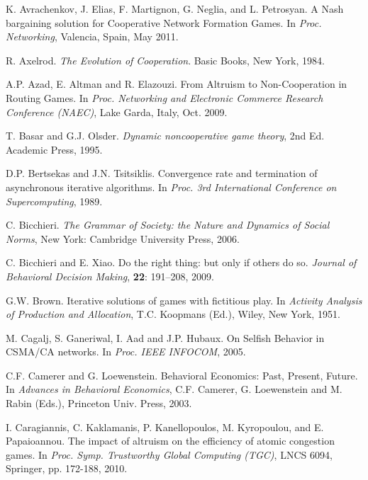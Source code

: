 \documentclass[12pt,onecolumn,draftcls]{IEEEtran}
\begin{document}
\begin{thebibliography}{9}
K. Avrachenkov, J. Elias, F. Martignon, G. Neglia, and L. Petrosyan. 
A Nash bargaining solution for Cooperative Network Formation Games. 
In {\em Proc. Networking}, Valencia, Spain, May 2011.


R. Axelrod. 
{\em The Evolution of Cooperation}.
Basic Books, New York,
1984.


A.P. Azad, E. Altman and R. Elazouzi.
From Altruism to Non-Cooperation in Routing Games. 
In {\em Proc. Networking and Electronic Commerce Research Conference (NAEC)},
Lake Garda, Italy, Oct.  2009.

T. Basar and G.J. Olsder.
{\em Dynamic noncooperative game theory}, 2nd Ed.
Academic Press, 1995.



D.P. Bertsekas and J.N. Tsitsiklis.
Convergence rate and termination of asynchronous iterative algorithms.
In {\em Proc. 3rd International Conference on Supercomputing}, 1989.

C. Bicchieri.
{\em The Grammar of Society: the Nature and Dynamics of Social Norms},
New York: Cambridge University Press, 2006.

C. Bicchieri and E. Xiao. 
Do the right thing: but only if others do so. 
{\em Journal of Behavioral Decision Making}, 
{\bf 22}: 191–208, 2009.








G.W. Brown. 
\newblock Iterative solutions of games with fictitious play.
\newblock In {\em Activity Analysis of Production 
and Allocation}, T.C. Koopmans (Ed.), Wiley, New York, 1951.



M. Cagalj, S. Ganeriwal, I. Aad and J.P. Hubaux.
On Selfish Behavior in CSMA/CA networks.
In {\em Proc. IEEE INFOCOM}, 2005.

C.F. Camerer and G. Loewenstein.  Behavioral Economics: Past, Present, Future.
In {\em Advances in Behavioral Economics},
C.F. Camerer, G. Loewenstein and M. Rabin (Eds.),
Princeton Univ. Press, 2003.

I. Caragiannis, C. Kaklamanis, P. Kanellopoulos, M. Kyropoulou, and 
E. Papaioannou. 
The impact of altruism on the efficiency of atomic congestion games. 
In {\em Proc. Symp. Trustworthy Global Computing (TGC)}, LNCS 6094, 
Springer, pp. 172-188, 2010.


\end{thebibliography}
\end{document}
